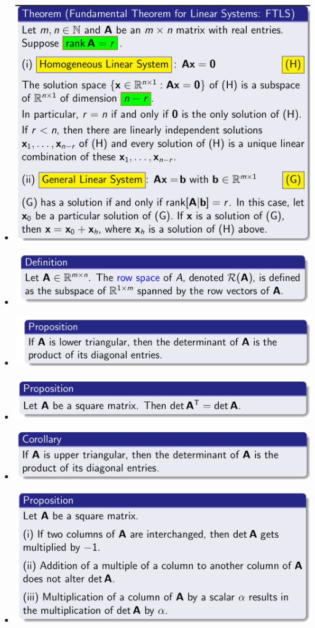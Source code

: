 \documentclass{article}
\begin{document}
\begin{itemize}
  \item \includegraphics[scale = 0.4]{32.png}
  \item \includegraphics[scale = 0.4]{33.png}
  \item \includegraphics[scale = 0.4]{34.png}
  \item \includegraphics[scale = 0.4]{35.png}
  \item \includegraphics[scale = 0.4]{36.png}
  \item \includegraphics[scale = 0.4]{37.png}

\end{itemize}
\end{document}
